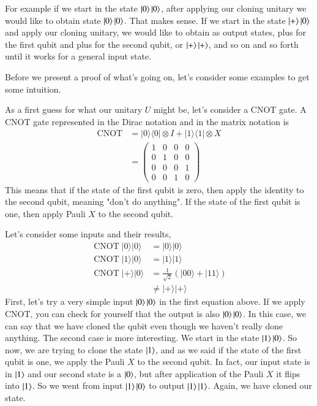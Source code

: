 For example if we start in the state $\left| 0 \right\rangle\left| 0 \right\rangle$, after applying our cloning unitary we would like to obtain state $\left| 0 \right\rangle\left| 0 \right\rangle$. That makes sense. If we start in the state $\left| + \right\rangle\left| 0 \right\rangle$ and apply our cloning unitary, we would like to obtain as output states, plus for the first qubit and plus for the second qubit, or $\left| + \right\rangle\left| + \right\rangle$, and so on and so forth until it works for a general input state.

Before we present a proof of what's going on, let's consider some examples to get some intuition.

As a first guess for what our unitary $U$ might be, let's consider a CNOT gate. A CNOT gate represented in the Dirac notation and in the matrix notation is
\begin{equation}
\begin{aligned}
\operatorname{CNOT} &=|0\rangle\langle 0|\otimes I+| 1\rangle\langle 1| \otimes X \\
&=\left(\begin{array}{llll}
1 & 0 & 0 & 0 \\
0 & 1 & 0 & 0 \\
0 & 0 & 0 & 1 \\
0 & 0 & 1 & 0
\end{array}\right)
\end{aligned}
\end{equation}
This means that if the state of the first qubit is zero, then apply the identity to the second qubit, meaning "don't do anything". If the state of the first qubit is one, then apply Pauli $X$ to the second qubit.

Let's consider some inputs and their results,
\begin{equation}
\begin{aligned}
\operatorname{CNOT} |0\rangle|0\rangle &=|0\rangle|0\rangle \\
\operatorname{CNOT} |1\rangle|0\rangle &=|1\rangle|1\rangle \\
\operatorname{CNOT} |+\rangle|0\rangle &=\frac{1}{\sqrt{2}}(|00\rangle+|11\rangle) \\
& \neq|+\rangle|+\rangle
\end{aligned}
\end{equation}
First, let's try a very simple input $\left| 0 \right\rangle\left| 0 \right\rangle$ in the first equation above. If we apply CNOT, you can check for yourself that the output is also $\left| 0 \right\rangle\left| 0 \right\rangle$. In this case, we can say that we have cloned the qubit even though we haven't really done anything. The second case is more interesting. We start in the state $\left| 1 \right\rangle\left| 0 \right\rangle$. So now, we are trying to clone the state $\left| 1 \right\rangle$, and as we said if the state of the first qubit is one, we apply the Pauli $X$ to the second qubit.  In fact, our input state is in $\left| 1 \right\rangle$ and our second state is a $\left| 0 \right\rangle$, but after application of the Pauli $X$ it flips into $\left| 1 \right\rangle$. So we went from input $\left| 1 \right\rangle\left| 0 \right\rangle$ to output $\left| 1 \right\rangle\left| 1 \right\rangle$. Again, we have cloned our state.

